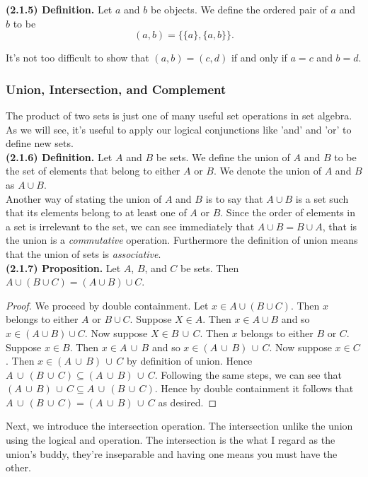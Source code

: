 \documentclass[12pt]{book}
\begin{document}
\noindent\textbf{(2.1.5) Definition.} Let $a$ and $b$ be objects. We define the ordered pair of $a$ and $b$ to be \[(a,b)=\{\{a\},\{a,b\}\}.\]

It's not too difficult to show that $(a,b)=(c,d)$ if and only if $a=c$ and $b=d$.

\subsubsection{Union, Intersection, and Complement}

The product of two sets is just one of many useful set operations in set algebra. As we will see, it's useful to apply our logical conjunctions like 'and' and 'or' to define new sets.\\

\noindent\textbf{(2.1.6) Definition.} Let $A$ and $B$ be sets. We define the union of $A$ and $B$ to be the set of elements that belong to either $A$ or $B$. We denote the union of $A$ and $B$ as $A\cup B$.\\

Another way of stating the union of $A$ and $B$ is to say that $A\cup B$ is a set such that its elements belong to at least one of $A$ or $B$. Since the order of elements in a set is irrelevant to the set, we can see immediately that $A\cup B=B\cup A$, that is the union is a \textit{commutative} operation. Furthermore the definition of union means that the union of sets is \textit{associative}. \\

\noindent\textbf{(2.1.7) Proposition.} Let $A$, $B$, and $C$ be sets. Then $A\cup(B\cup C)=(A\cup B)\cup C$.
\begin{proof}
We proceed by double containment. Let $x\in A\cup(B\cup C)$. Then $x$ belongs to either $A$ or $B\cup C$. Suppose $X\in A$. Then $x\in A\cup B$ and so $x\in (A\cup B)\cup C$. Now suppose $X\in B\,\cup\,  C$. Then $x$ belongs to either $B$ or $C$. Suppose $x\in B$. Then $x\in A\,\cup\,  B$ and so $x\in (A\,\cup\,  B)\,\cup\,  C$. Now suppose $x\in C$. Then $x\in (A\,\cup\,  B)\,\cup\,  C$ by definition of union. Hence $A\,\cup\, (B\,\cup\,  C)\subseteq (A\,\cup\,  B)\,\cup\,  C$. Following the same steps, we can see that $(A\,\cup\,  B)\,\cup\,  C\subseteq A\,\cup\, (B\,\cup\, C)$. Hence by double containment it follows that $A\,\cup\, (B\,\cup\, C)=(A\,\cup\,  B)\,\cup\,  C$ as desired.
\end{proof}

Next, we introduce the intersection operation. The intersection unlike the union using the logical and operation. The intersection is the what I regard as the union's buddy, they're inseparable and having one means you must have the other.\\
\end{document}
